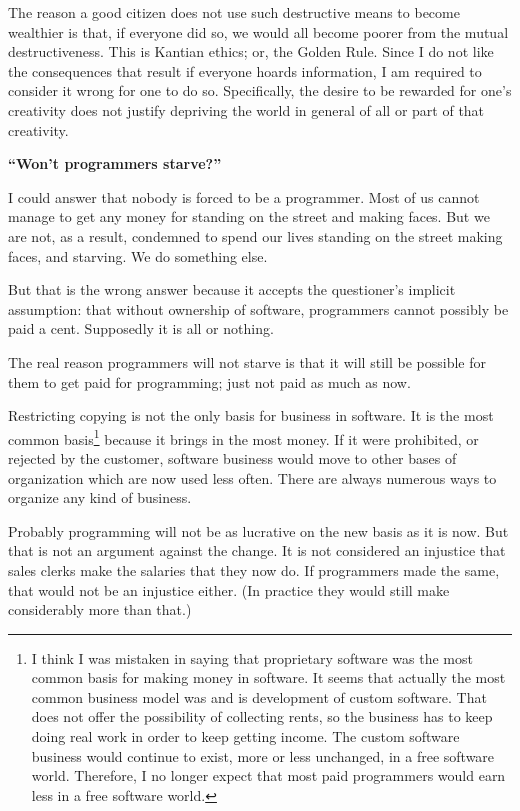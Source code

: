 The reason a good citizen does not use such destructive means to become wealthier is that, if everyone did so, we would all become poorer from the mutual destructiveness. This is Kantian ethics; or, the Golden Rule. Since I do not like the consequences that result if everyone hoards information, I am required to consider it wrong for one to do so. Specifically, the desire to be rewarded for one's creativity does not justify depriving the world in general of all or part of that creativity.\par
\textbf{“Won't programmers starve?”}\par
I could answer that nobody is forced to be a programmer. Most of us cannot manage to get any money for standing on the street and making faces. But we are not, as a result, condemned to spend our lives standing on the street making faces, and starving. We do something else.\par
But that is the wrong answer because it accepts the questioner's implicit assumption: that without ownership of software, programmers cannot possibly be paid a cent. Supposedly it is all or nothing.\par
The real reason programmers will not starve is that it will still be possible for them to get paid for programming; just not paid as much as now.\par
Restricting copying is not the only basis for business in software. It is the most common basis\footnote{I think I was mistaken in saying that proprietary software was the most common basis for making money in software. It seems that actually the most common business model was and is development of custom software. That does not offer the possibility of collecting rents, so the business has to keep doing real work in order to keep getting income. The custom software business would continue to exist, more or less unchanged, in a free software world. Therefore, I no longer expect that most paid programmers would earn less in a free software world.} because it brings in the most money. If it were prohibited, or rejected by the customer, software business would move to other bases of organization which are now used less often. There are always numerous ways to organize any kind of business.\par
Probably programming will not be as lucrative on the new basis as it is now. But that is not an argument against the change. It is not considered an injustice that sales clerks make the salaries that they now do. If programmers made the same, that would not be an injustice either. (In practice they would still make considerably more than that.)\par
